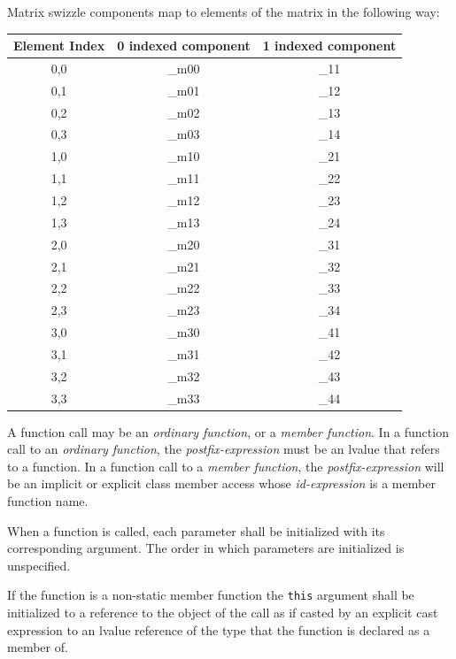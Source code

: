 \p Matrix swizzle components map to elements of the matrix in the following way:

\begin{center}
  \begin{tabular}{|| c | c | c ||}
    \hline
    Element Index & 0 indexed component & 1 indexed component \\
    \hline
    0,0 & \_m00 & \_11 \\
    0,1 & \_m01 & \_12 \\
    0,2 & \_m02 & \_13 \\
    0,3 & \_m03 & \_14 \\
    1,0 & \_m10 & \_21 \\
    1,1 & \_m11 & \_22 \\
    1,2 & \_m12 & \_23 \\
    1,3 & \_m13 & \_24 \\
    2,0 & \_m20 & \_31 \\
    2,1 & \_m21 & \_32 \\
    2,2 & \_m22 & \_33 \\
    2,3 & \_m23 & \_34 \\
    3,0 & \_m30 & \_41 \\
    3,1 & \_m31 & \_42 \\
    3,2 & \_m32 & \_43 \\
    3,3 & \_m33 & \_44 \\
    \hline
  \end{tabular}
\end{center}


\p A function call may be an \textit{ordinary function}, or a \textit{member
function}. In a function call to an \textit{ordinary function}, the
\textit{postfix-expression} must be an lvalue that refers to a function. In a
function call to a \textit{member function}, the \textit{postfix-expression}
will be an implicit or explicit class member access whose \textit{id-expression}
is a member function name.

\p When a function is called, each parameter shall be initialized with its
corresponding argument. The order in which parameters are initialized is
unspecified.

\p If the function is a non-static member function the \texttt{this} argument
shall be initialized to a reference to the object of the call as if casted by an
explicit cast expression to an lvalue reference of the type that the function is
declared as a member of.

